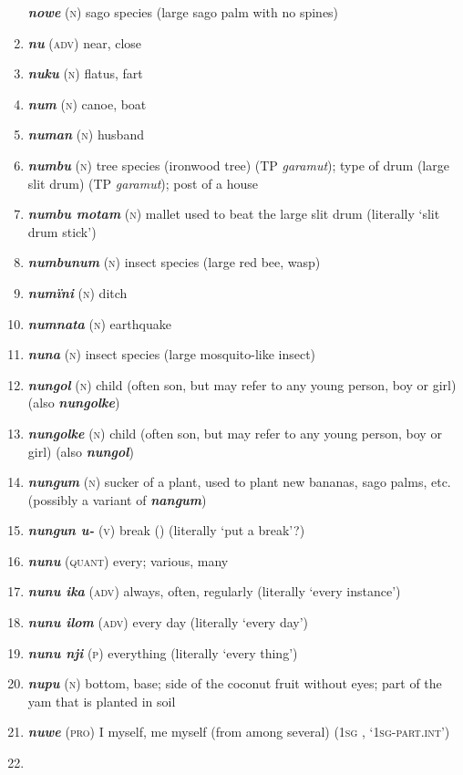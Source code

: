 \begin{enumerate}[noitemsep, label={}, align=left, widest=190, labelsep=1ex,leftmargin=*,itemindent=-10pt]
\textbf{\textit{nowe}} (\textsc{n}) sago species (large sago palm with no spines) \item 
\textbf{\textit{nu}} (\textsc{adv)} near, close \item 
\textbf{\textit{nuku}} (\textsc{n}) flatus, fart \item 
\textbf{\textit{num}} (\textsc{n}) canoe, boat \item 
\textbf{\textit{numan}} (\textsc{n}) husband \item 
\textbf{\textit{numbu}} (\textsc{n}) tree species (ironwood tree) (TP \textit{garamut}); type of drum (large slit drum) (TP \textit{garamut}); post of a house \item 
\textbf{\textit{numbu motam}} (\textsc{n}) mallet used to beat the large slit drum (literally ‘slit drum stick’) \item 
\textbf{\textit{numbunum}} (\textsc{n}) insect species (large red bee, wasp) \item 
\textbf{\textit{numïni}} (\textsc{n}) ditch \item 
\textbf{\textit{numnata}} (\textsc{n}) earthquake \item 
\textbf{\textit{nuna}} (\textsc{n}) insect species (large mosquito-like insect) \item 
\textbf{\textit{nungol}} (\textsc{n}) child (often son, but may refer to any young person, boy or girl) (also \textbf{\textit{nungolke}}) \item 
\textbf{\textit{nungolke}} (\textsc{n}) child (often son, but may refer to any young person, boy or girl) (also \textbf{\textit{nungol}}) \item 
\textbf{\textit{nungum}} (\textsc{n}) sucker of a plant, used to plant new bananas, sago palms, etc. \linebreak (possibly a variant of \textbf{\textit{nangum}}) \item 
\textbf{\textit{nungun u-}} (\textsc{v}) break () (literally ‘put a break’?) \item 
\textbf{\textit{nunu}} (\textsc{quant}) every; various, many \item 
\textbf{\textit{nunu ika}} (\textsc{adv}) always, often, regularly (literally ‘every instance’) \item 
\textbf{\textit{nunu ilom}} (\textsc{adv}) every day (literally ‘every day’) \item 
\textbf{\textit{nunu nji}} (\textsc{p}) everything (literally ‘every thing’) \item 
\textbf{\textit{nupu}} (\textsc{n}) bottom, base; side of the coconut fruit without eyes; part of the yam that is planted in soil \item 
\textbf{\textit{nuwe}} (\textsc{pro}) I myself, me myself (from among several) (1\textsc{sg} , ‘\textsc{1sg-part.int}’)\\ \item 


\end{enumerate}
